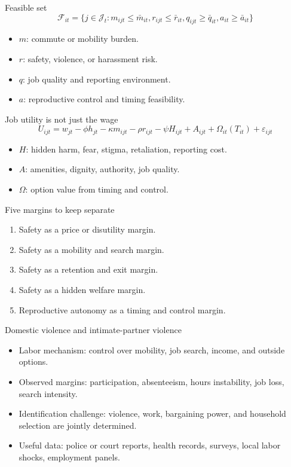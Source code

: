 \documentclass[aspectratio=169,11pt]{beamer}
\begin{document}
\begin{frame}{Feasible set}
\[
\mathcal{F}_{it}
=
\{j\in\mathcal{J}_{t}:
m_{ijt}\leq \bar m_{it},
r_{ijt}\leq \bar r_{it},
q_{ijt}\geq \bar q_{it},
a_{it}\geq \bar a_{it}\}
\]
\begin{itemize}
    \item \(m\): commute or mobility burden.
    \item \(r\): safety, violence, or harassment risk.
    \item \(q\): job quality and reporting environment.
    \item \(a\): reproductive control and timing feasibility.
\end{itemize}
\end{frame}

\begin{frame}{Job utility is not just the wage}
\[
U_{ijt}=
w_{jt}
-\phi h_{jt}
-\kappa m_{ijt}
-\rho r_{ijt}
-\psi H_{ijt}
+A_{ijt}
+\Omega_{it}(T_{it})
+\varepsilon_{ijt}
\]
\begin{itemize}
    \item \(H\): hidden harm, fear, stigma, retaliation, reporting cost.
    \item \(A\): amenities, dignity, authority, job quality.
    \item \(\Omega\): option value from timing and control.
\end{itemize}
\end{frame}

\begin{frame}{Five margins to keep separate}
\begin{enumerate}
    \item Safety as a price or disutility margin.
    \item Safety as a mobility and search margin.
    \item Safety as a retention and exit margin.
    \item Safety as a hidden welfare margin.
    \item Reproductive autonomy as a timing and control margin.
\end{enumerate}
\end{frame}

\begin{frame}{Domestic violence and intimate-partner violence}
\begin{itemize}
    \item Labor mechanism: control over mobility, job search, income, and outside options.
    \item Observed margins: participation, absenteeism, hours instability, job loss, search intensity.
    \item Identification challenge: violence, work, bargaining power, and household selection are jointly determined.
    \item Useful data: police or court reports, health records, surveys, local labor shocks, employment panels.
\end{itemize}
\end{frame}
\end{document}
